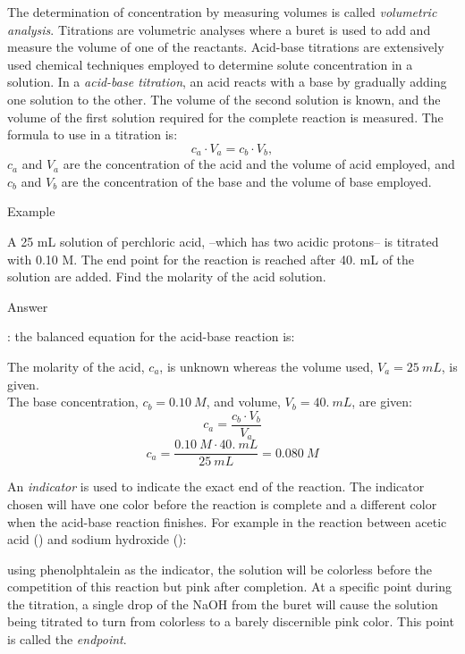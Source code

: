 \documentclass[main.tex]{subfiles}
\begin{document}
\vspace{0.2cm}{\large \bfseries Volumetric analysis} The determination of concentration by measuring volumes is called \textit{volumetric analysis}. Titrations are volumetric analyses where a buret is used to add and measure the volume of one of the reactants. Acid-base titrations are extensively used chemical techniques employed to determine solute concentration in a solution. In a \textit{acid-base titration}, an acid reacts with a base by gradually adding one solution to the other. The volume of the second solution is known, and the volume of the first solution required for the complete reaction is measured. The formula to use in a titration is:
\[ c_a\cdot V_a= c_b\cdot V_b,\]
$c_a$ and $V_a$ are the concentration of the acid and the volume of acid employed, and  $c_b$ and $V_b$ are the concentration of the base and the volume of base employed. 
\begin{center}\begin{example}{Example}
\begin{it}A 25 mL solution of perchloric acid,  --which has two acidic protons-- is titrated with  0.10 M. The end point for the reaction is reached after 40. mL of the  solution are added. Find the molarity of the acid solution.\end{it}
\Sepline
\begin{bf}Answer\end{bf}: the balanced equation for the acid-base reaction is:\\
\begin{center}\end{center}
The molarity of the acid, $c_a$, is unknown whereas the volume used, $V_a=25\:mL$, is given.\\
The base concentration, $c_b=0.10\:M$, and volume, $V_b=40.\:mL$, are given:
\[c_a=\frac{ c_b\cdot V_b}{ V_a}\]
\[c_a=\frac{ 0.10\:M\cdot 40.\:mL}{25\:mL}=0.080\:M\]
\end{example}\end{center}


An \textit{indicator} is used to indicate the exact end of the reaction.  The indicator chosen will have one color before the reaction is complete and a different color when the acid-base reaction finishes. 
For example in the reaction between acetic acid () and sodium hydroxide ():
\begin{center}\end{center}
using phenolphtalein as the indicator, the solution will be colorless before the competition of this reaction but pink after completion. At a specific point during the titration, a single drop of the NaOH from the buret will cause the solution being titrated to turn from colorless to a barely discernible pink color. This point is called the \textit{endpoint}. 
\end{document}
